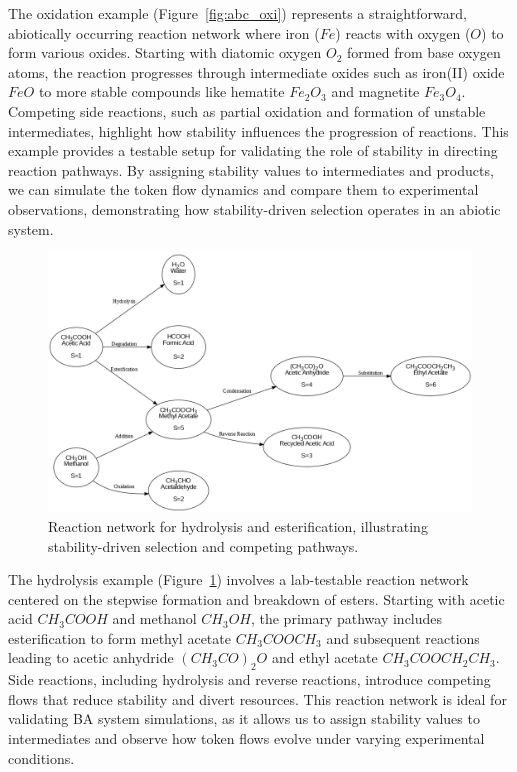\documentclass[entropy,article,submit,pdftex,moreauthors]{Definitions/mdpi}
\begin{document}
The oxidation example (Figure~\ref{fig:abc_oxi}) represents a straightforward, abiotically occurring reaction network where iron (\(Fe\)) reacts with oxygen (\(O\)) to form various oxides. Starting with diatomic oxygen \(O_2\) formed from base oxygen atoms, the reaction progresses through intermediate oxides such as iron(II) oxide \(FeO\) to more stable compounds like hematite \(Fe_2O_3\) and magnetite \(Fe_3O_4\). Competing side reactions, such as partial oxidation and formation of unstable intermediates, highlight how stability influences the progression of reactions. This example provides a testable setup for validating the role of stability in directing reaction pathways. By assigning stability values to intermediates and products, we can simulate the token flow dynamics and compare them to experimental observations, demonstrating how stability-driven selection operates in an abiotic system.

\begin{figure}[h]
    \centering
    \includegraphics[width=1\textwidth]{abc_hydro.png}
    \caption{Reaction network for hydrolysis and esterification, illustrating stability-driven selection and competing pathways.}
    \label{fig:abc_hydro}
\end{figure}

The hydrolysis example (Figure~\ref{fig:abc_hydro}) involves a lab-testable reaction network centered on the stepwise formation and breakdown of esters. Starting with acetic acid \(CH_3COOH\) and methanol \(CH_3OH\), the primary pathway includes esterification to form methyl acetate \(CH_3COOCH_3\) and subsequent reactions leading to acetic anhydride \((CH_3CO)_2O\) and ethyl acetate \(CH_3COOCH_2CH_3\). Side reactions, including hydrolysis and reverse reactions, introduce competing flows that reduce stability and divert resources. This reaction network is ideal for validating BA system simulations, as it allows us to assign stability values to intermediates and observe how token flows evolve under varying experimental conditions.
\end{document}
